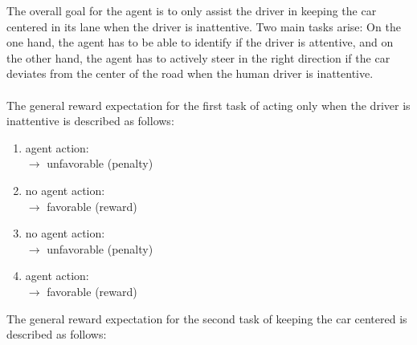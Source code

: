 The overall goal for the agent is to only assist the driver in keeping the car centered in its lane when the driver is inattentive. Two main tasks arise: On the one hand, the agent has to be able to identify if the driver is attentive, and on the other hand, the agent has to actively steer in the right direction if the car deviates from the center of the road when the human driver is inattentive.\\
\\
The general reward expectation for the first task of acting only when the driver is inattentive is described as follows:
\begin{enumerate}[noitemsep]
    \item {} agent action: \\$\rightarrow$ unfavorable (penalty)
    \item {} no agent action: \\$\rightarrow$ favorable (reward)
    \item {} no agent action: \\$\rightarrow$ unfavorable (penalty)
    \item {} agent action: \\$\rightarrow$ favorable (reward)
\end{enumerate}
The general reward expectation for the second task of keeping the car centered is described as follows:
